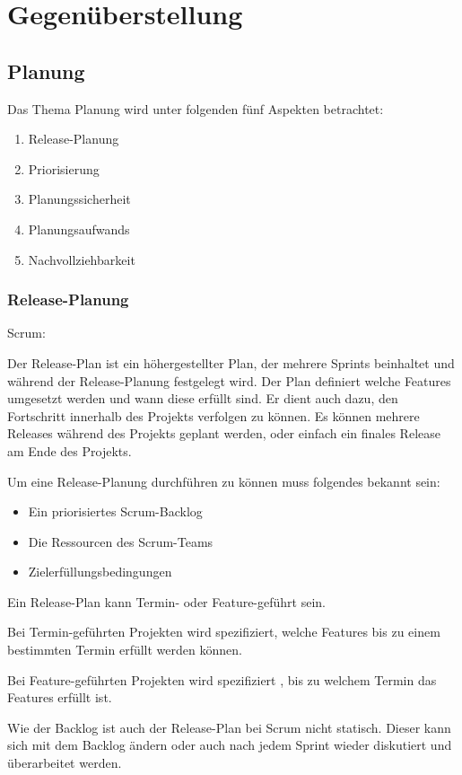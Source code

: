 \chapter{Gegenüberstellung}
\thispagestyle{fancy}
\section{Planung}

Das Thema Planung wird unter folgenden fünf Aspekten betrachtet:
\begin{enumerate}
\item Release-Planung
\item Priorisierung
\item Planungssicherheit
\item Planungsaufwands
\item Nachvollziehbarkeit
\end{enumerate}

\subsection{Release-Planung}

{\Large Scrum:} \cite{planningReleaseScrum} \medskip

Der Release-Plan ist ein höhergestellter Plan, der mehrere Sprints beinhaltet und während der Release-Planung festgelegt wird. Der Plan definiert welche Features umgesetzt werden und wann diese erfüllt sind. Er dient auch dazu, den Fortschritt innerhalb des Projekts verfolgen zu können. Es können mehrere Releases während des Projekts geplant werden, oder einfach ein finales Release am Ende des Projekts. \medskip

Um eine Release-Planung durchführen zu können muss folgendes bekannt sein:
\begin{itemize}
\item Ein priorisiertes Scrum-Backlog
\item Die Ressourcen des Scrum-Teams
\item Zielerfüllungsbedingungen
\end{itemize}
Ein Release-Plan kann Termin- oder Feature-geführt sein.\smallskip

Bei Termin-geführten Projekten wird spezifiziert, welche Features bis zu einem bestimmten Termin erfüllt werden können.\smallskip

Bei Feature-geführten Projekten wird spezifiziert , bis zu welchem Termin das Features erfüllt ist.\smallskip

Wie der Backlog ist auch der Release-Plan bei Scrum nicht statisch. Dieser kann sich mit dem Backlog ändern oder auch nach jedem Sprint wieder diskutiert und überarbeitet werden.
\bigskip 

